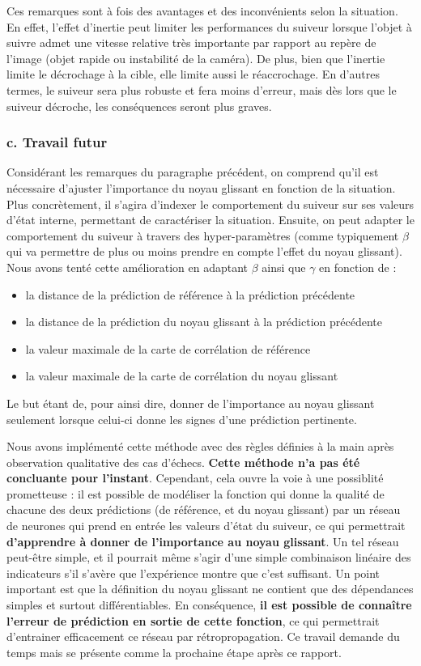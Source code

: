 \documentclass[10pt,twocolumn,letterpaper,french]{article}
\begin{document}
Ces remarques sont à fois des avantages et des inconvénients selon la situation. En effet, l'effet d'inertie peut limiter les performances du suiveur lorsque l'objet à suivre admet une vitesse relative très importante par rapport au repère de l'image (objet rapide ou instabilité de la caméra). De plus, bien que l'inertie limite le décrochage à la cible, elle limite aussi le réaccrochage. En d'autres termes, le suiveur sera plus robuste et fera moins d'erreur, mais dès lors que le suiveur décroche, les conséquences seront plus graves.

\subsubsection*{c. Travail futur}

Considérant les remarques du paragraphe précédent, on comprend qu'il est nécessaire d'ajuster l'importance du noyau glissant en fonction de la situation. Plus concrètement, il s'agira d'indexer le comportement du suiveur sur ses valeurs d'état interne, permettant de caractériser la situation. Ensuite, on peut adapter le comportement du suiveur à travers des hyper-paramètres (comme typiquement $\beta$ qui va permettre de plus ou moins prendre en compte l'effet du noyau glissant). Nous avons tenté cette amélioration en adaptant $\beta$ ainsi que $\gamma$ en fonction de :
\begin{itemize}
  \item la distance de la prédiction de référence à la prédiction précédente
  \item la distance de la prédiction du noyau glissant à la prédiction précédente
  \item la valeur maximale de la carte de corrélation de référence
  \item la valeur maximale de la carte de corrélation du noyau glissant
\end{itemize}
Le but étant de, pour ainsi dire, donner de l'importance au noyau glissant seulement lorsque celui-ci donne les signes d'une prédiction pertinente.

Nous avons implémenté cette méthode avec des règles définies à la main après observation qualitative des cas d'échecs. \textbf{Cette méthode n'a pas été concluante pour l'instant}. Cependant, cela ouvre la voie à une possiblité prometteuse : il est possible de modéliser la fonction qui donne la qualité de chacune des deux prédictions (de référence, et du noyau glissant) par un réseau de neurones qui prend en entrée les valeurs d'état du suiveur, ce qui permettrait \textbf{d'apprendre à donner de l'importance au noyau glissant}. Un tel réseau peut-être simple, et il pourrait même s'agir d'une simple combinaison linéaire des indicateurs s'il s'avère que l'expérience montre que c'est suffisant. Un point important est que la définition du noyau glissant ne contient que des dépendances simples et surtout différentiables. En conséquence, \textbf{il est possible de connaître l'erreur de prédiction en sortie de cette fonction}, ce qui permettrait d'entrainer efficacement ce réseau par rétropropagation. Ce travail demande du temps mais se présente comme la prochaine étape après ce rapport.
\end{document}
